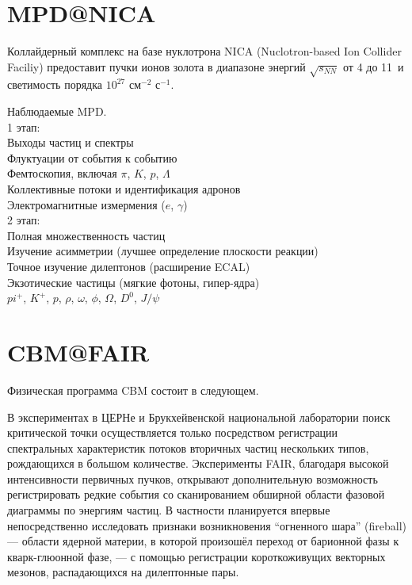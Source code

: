 \section{MPD@NICA}

Коллайдерный комплекс на базе нуклотрона NICA (Nuclotron-based Ion Collider Faciliy) предоставит пучки ионов золота в диапазоне энергий $\sqrt{s_{NN}}$ от 4 до 11~\GeVperNucl и светимость порядка $10^{27}$ см$^{-2}$ с$^{-1}$.



Наблюдаемые MPD. \\
1 этап: \\
Выходы частиц и спектры \\
Флуктуации от события к событию \\
Фемтоскопия, включая $\pi$, $K$, $p$, $\Lambda$ \\
Коллективные потоки и идентификация адронов \\
Электромагнитные измермения ($e$, $\gamma$) \\

2 этап: \\
Полная множественность частиц \\
Изучение асимметрии (лучшее определение плоскости реакции) \\
Точное изучение дилептонов (расширение ECAL) \\
Экзотические частицы (мягкие фотоны, гипер-ядра) \\


$pi^{+}$, $K^{+}$, $p$, $\rho$, $\omega$, $\phi$, $\Omega$, $D^{0}$, $J/\psi$

\section{CBM@FAIR}

Физическая программа CBM состоит в следующем.

В экспериментах в ЦЕРНе и Брукхейвенской национальной лаборатории поиск критической точки осуществляется только посредством регистрации спектральных характеристик потоков вторичных частиц нескольких типов, рождающихся в большом количестве. Эксперименты FAIR, благодаря высокой интенсивности первичных пучков, открывают дополнительную возможность регистрировать редкие события со сканированием обширной области фазовой диаграммы по энергиям частиц. В частности планируется впервые непосредственно исследовать признаки возникновения ``огненного шара'' (fireball) --- области ядерной материи, в которой произошёл переход от барионной фазы к кварк-глюонной фазе, --- с помощью регистрации короткоживущих векторных мезонов, распадающихся на дилептонные пары.

